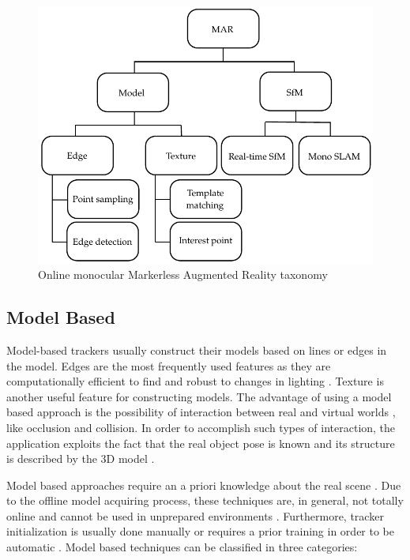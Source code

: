 \begin{figure}[!htb]
  \centering
  \includegraphics{chapters/basic_concepts/mar_taxonomy.pdf}
  \caption{Online monocular Markerless Augmented Reality taxonomy}
  \label{figure:mar_taxonomy}
\end{figure}

\subsection{Model Based} %
\label{sub:basic_concepts:markerless_tracking_technique:model_based}

Model-based trackers usually construct their models based on lines or edges in the model. Edges are the most frequently used features as they are computationally efficient to find and robust to changes in lighting \cite{Zhou2008}. Texture is another useful feature for constructing models. The advantage of using a model based approach is the possibility of interaction between real and virtual worlds \cite{Teichrieb2007}, like occlusion and collision. In order to accomplish such types of interaction, the application exploits the fact that the real object pose is known and its structure is described by the 3D model \cite{Teichrieb2007}.

Model based approaches require an a priori knowledge about the real scene \cite{Teichrieb2007}. Due to the offline model acquiring process, these techniques are, in general, not totally online and cannot be used in unprepared environments \cite{Teichrieb2007}. Furthermore, tracker initialization is usually done manually or requires a prior training in order to be automatic \cite{Teichrieb2007}. Model based techniques can be classified in three categories:


